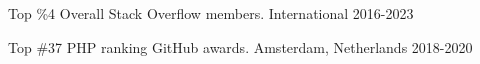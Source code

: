 



\begin{cvhonors}

  \cvhonor
    {Top \%4} %
    {Overall Stack Overflow members.} %
    {International} %
    {2016-2023} %

  \cvhonor
    {Top \#37} %
    {PHP ranking GitHub awards.} %
    {Amsterdam, Netherlands} %
    {2018-2020} %

\end{cvhonors}
